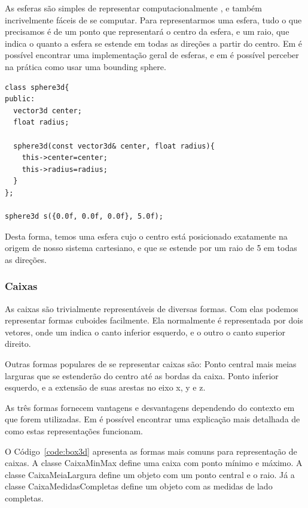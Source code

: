 As esferas são simples de representar computacionalmente , e também
incrivelmente fáceis de se computar. Para representarmos uma esfera, tudo o que
precisamos é de um ponto que representará o centro da esfera, e um raio, que
indica o quanto a esfera se estende em todas as direções a partir do centro.
Em  é possível encontrar uma implementação geral de esferas, e em  é possível perceber na prática como usar uma bounding sphere.

\begin{lstlisting}[frame=single,caption=Representação de esfera\label{code:sphere3d}]
class sphere3d{
public:
  vector3d center;
  float radius;
  
  sphere3d(const vector3d& center, float radius){
    this->center=center;
    this->radius=radius;
  }
};

sphere3d s({0.0f, 0.0f, 0.0f}, 5.0f);

\end{lstlisting}

Desta forma, temos uma esfera cujo o centro está posicionado exatamente na origem de
nosso sistema cartesiano, e que se estende por um raio de 5 em todas as
direções.

\subsubsection{Caixas}

As caixas são trivialmente representáveis de diversas formas. Com elas podemos
representar formas cuboides facilmente. Ela normalmente é representada por dois
vetores, onde um indica o canto inferior esquerdo, e o outro o canto superior direito.

Outras formas populares de se representar caixas são:
Ponto central mais meias larguras que se estenderão do centro até as bordas da caixa.
Ponto inferior esquerdo, e a extensão de suas arestas no eixo x, y e z.

As três formas fornecem vantagens e desvantagens dependendo do contexto em que forem utilizadas. Em  é possível encontrar uma explicação mais detalhada de como estas representações funcionam.


O Código~\ref{code:box3d} apresenta as formas mais comuns para representação de caixas. A classe CaixaMinMax define uma caixa com ponto mínimo e máximo. A classe CaixaMeiaLargura define um objeto com um ponto central e o raio. Já a classe CaixaMedidasCompletas define um objeto com as medidas de lado completas.

